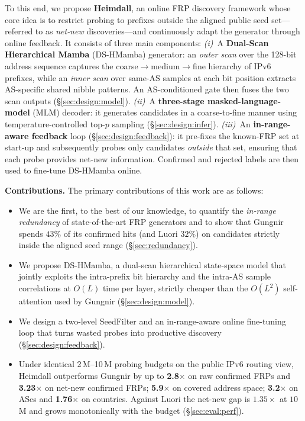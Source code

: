 \documentclass[conference]{IEEEtran}
\begin{document}
To this end, we propose \textbf{Heimdall}, an online FRP discovery
framework whose core idea is to restrict probing to prefixes
outside the aligned public seed set---referred to as \emph{net‑new} discoveries---and continuously adapt the
generator through online feedback. It consists of three main
components:
\emph{(i)}~A \textbf{Dual-Scan Hierarchical Mamba} (DS-HMamba)
generator: an \emph{outer scan} over the 128-bit address sequence captures
the coarse$\rightarrow$medium$\rightarrow$fine hierarchy of
IPv6 prefixes, while an \emph{inner scan} over same-AS samples at each bit position extracts AS-specific shared nibble patterns. An AS-conditioned gate then fuses the two scan outputs (\S\ref{sec:design:model}).
\emph{(ii)}~A \textbf{three-stage masked-language-model} (MLM) decoder: it
generates candidates in a coarse-to-fine manner using temperature-controlled
top-$p$ sampling (\S\ref{sec:design:infer}).
\emph{(iii)}~An \textbf{in-range-aware feedback} loop
(\S\ref{sec:design:feedback}): it pre-fixes the known-FRP set at
start-up and subsequently probes only candidates \emph{outside}
that set, ensuring that each probe provides net-new information.
Confirmed and rejected labels are then used to fine-tune DS-HMamba online.

\smallskip\textbf{Contributions.}
The primary contributions of this work are as follows:
\begin{itemize}
    \item We are the first, to the best of our knowledge, to
    quantify the \emph{in-range redundancy} of state-of-the-art FRP
    generators and to show that Gungnir spends $43\%$ of its confirmed
    hits (and Luori $32\%$) on candidates strictly inside the aligned
    seed range (\S\ref{sec:redundancy}).
    \item We propose DS-HMamba, a dual-scan hierarchical state-space
    model that jointly exploits the intra-prefix bit hierarchy and
    the intra-AS sample correlations at $O(L)$ time per layer,
    strictly cheaper than the $O(L^2)$ self-attention used by
    Gungnir (\S\ref{sec:design:model}).
    \item We design a two-level SeedFilter and an in-range-aware
    online fine-tuning loop that turns wasted probes into productive
    discovery (\S\ref{sec:design:feedback}).
    \item Under identical 2\,M--10\,M probing budgets on the
    public IPv6 routing view, Heimdall outperforms Gungnir by up to
    \textbf{2.8$\times$} on raw confirmed FRPs and
    \textbf{3.23$\times$} on net-new confirmed FRPs;
    \textbf{5.9$\times$} on covered address space; \textbf{3.2$\times$}
    on ASes and \textbf{1.76$\times$} on countries.  Against Luori
    the net-new gap is $\mathbf{1.35\times}$ at $10$M and grows
    monotonically with the budget (\S\ref{sec:eval:perf}).
\end{itemize}
\end{document}
